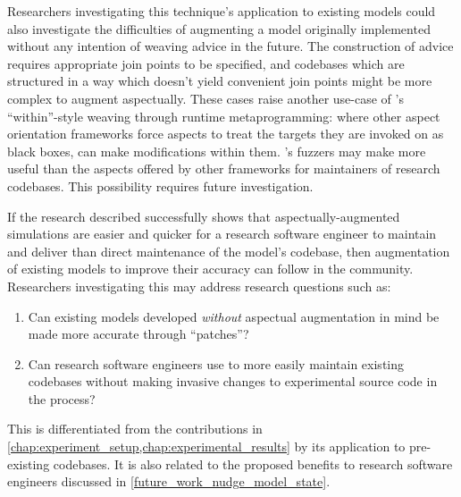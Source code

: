 Researchers investigating this technique's application to existing models could
also investigate the difficulties of augmenting a model originally implemented
without any intention of weaving advice in the future. The construction of
advice requires appropriate join points to be specified, and codebases which are
structured in a way which doesn't yield convenient join points might be more
complex to augment aspectually. These cases raise another use-case of \pdsf{}'s
``within''-style weaving through runtime metaprogramming: where other aspect
orientation frameworks force aspects to treat the targets they are invoked on as
black boxes, \pdsf can make modifications within them. \pdsf{}'s fuzzers may
make \aop{} more useful than the aspects offered by other frameworks for
maintainers of research codebases. This possibility requires future
investigation.

If the research described successfully shows that aspectually-augmented
simulations are easier and quicker for a research software engineer to maintain
and deliver than direct maintenance of the model's codebase, then augmentation
of existing models to improve their accuracy can follow in the community.
Researchers investigating this may address research questions such as:

\begin{researchquestion}
    \begin{enumerate}
\item Can existing models developed \emph{without} aspectual augmentation in
mind be made more accurate through \aspectoriented{} ``patches''?
\item Can research software engineers use \aop{} to more easily maintain
existing codebases without making invasive changes to experimental source code
in the process?
    \end{enumerate}
\end{researchquestion}

This is differentiated from the contributions in \cref{chap:experiment_setup,chap:experimental_results}
by its application to pre-existing
codebases. It is also related to the proposed benefits to research software
engineers discussed in \cref{future_work_nudge_model_state}.
    


